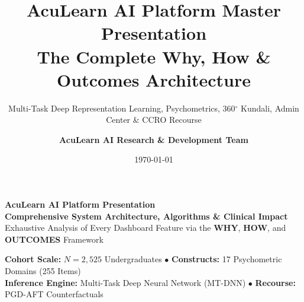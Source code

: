 \documentclass[aspectratio=169,10pt]{beamer}
\title{\textbf{\Huge AcuLearn AI Platform Master Presentation}\\[0.25cm]\Large The Complete Why, How \& Outcomes Architecture}
\subtitle{\normalsize Multi-Task Deep Representation Learning, Psychometrics, 360$^\circ$ Kundali, Admin Center \& CCRO Recourse}
\author{\textbf{AcuLearn AI Research \& Development Team}}
\institute{Department of Computer Science \& Engineering $\bullet$ Educational AI \& Decision Support}
\date{\today}
\begin{document}
{
\begin{frame}
  \begin{center}
    \vspace{0.4cm}
    {\color{white}\Huge\textbf{AcuLearn AI Platform Presentation}}\\[0.25cm]
    {\color{neutralframe}\Large\textbf{Comprehensive System Architecture, Algorithms \& Clinical Impact}}\\[0.15cm]
    {\color{white}\small Exhaustive Analysis of Every Dashboard Feature via the \textbf{WHY}, \textbf{HOW}, and \textbf{OUTCOMES} Framework}\\[0.4cm]
    
    \begin{tcolorbox}[colframe=neutralframe,colback=cardbg,coltext=white,width=0.92\textwidth,arc=6pt]
    \centering\footnotesize
    \textbf{Cohort Scale:} $N=2,525$ Undergraduates $\bullet$ \textbf{Constructs:} 17 Psychometric Domains (255 Items)\\
    \textbf{Inference Engine:} Multi-Task Deep Neural Network (MT-DNN) $\bullet$ \textbf{Recourse:} PGD-AFT Counterfactuals
    \end{tcolorbox}
  \end{center}
\end{frame}
}
\end{document}
